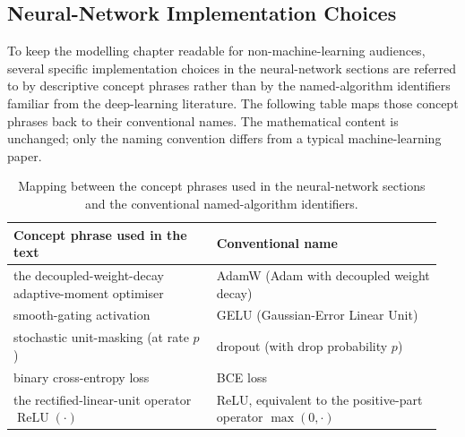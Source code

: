 \documentclass[english, 12pt, a4paper, elec, utf8, a-2b, online]{aaltothesis}
\begin{document}
\subsection{Neural-Network Implementation Choices}
\label{app:nn-implementation-mapping}

To keep the modelling chapter readable for non-machine-learning audiences, several specific implementation choices in the neural-network sections are referred to by descriptive concept phrases rather than by the named-algorithm identifiers familiar from the deep-learning literature. The following table maps those concept phrases back to their conventional names. The mathematical content is unchanged; only the naming convention differs from a typical machine-learning paper.

\begin{table}[h]
\centering
\begin{tabular}{p{0.45\linewidth} p{0.5\linewidth}}
\toprule
\textbf{Concept phrase used in the text} & \textbf{Conventional name} \\
\midrule
the decoupled-weight-decay adaptive-moment optimiser & AdamW (Adam with decoupled weight decay) \\
smooth-gating activation & GELU (Gaussian-Error Linear Unit) \\
stochastic unit-masking (at rate $p$) & dropout (with drop probability $p$) \\
binary cross-entropy loss & BCE loss \\
the rectified-linear-unit operator $\operatorname{ReLU}(\cdot)$ & ReLU, equivalent to the positive-part operator $\max(0,\cdot)$ \\
\bottomrule
\end{tabular}
\caption{Mapping between the concept phrases used in the neural-network sections and the conventional named-algorithm identifiers.}
\end{table}


\thesisbibliography
\printbibliography
\end{document}
